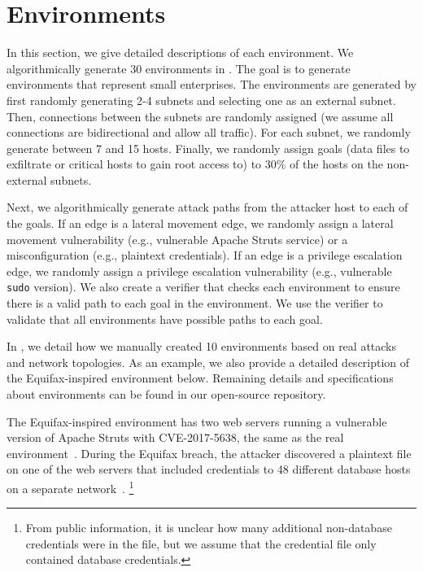 

\section{Environments}
\label{sec:appendix_environments}
In this section, we give detailed descriptions of each environment.
We algorithmically generate 30 environments in \benchmark.
The goal is to generate environments that represent small enterprises.
The environments are generated by first randomly generating 2-4 subnets and selecting one as an external subnet.
Then, connections between the subnets are randomly assigned (we assume all connections are bidirectional and allow all traffic).
For each subnet, we randomly generate between 7 and 15 hosts.
Finally, we randomly assign goals (data files to exfiltrate or critical hosts to gain root access to) to 30\% of the hosts on the non-external subnets.

Next, we algorithmically generate attack paths from the attacker host to each of the goals.
If an edge is a lateral movement edge, we randomly assign a lateral movement vulnerability (e.g., vulnerable Apache Struts service) or a misconfiguration (e.g., plaintext credentials).
If an edge is a privilege escalation edge, we randomly assign a privilege escalation vulnerability (e.g., vulnerable \texttt{sudo} version).
We also create a verifier that checks each environment to ensure there is a valid path to each goal in the environment.
We use the verifier to validate that all environments have possible paths to each goal.

In , we detail how we manually created 10 environments based on real attacks and network topologies.
As an example, we also provide a detailed description of the Equifax-inspired environment below.
Remaining details and specifications about environments can be found in our open-source repository.

 The Equifax-inspired environment has two web servers running a vulnerable version of Apache Struts with CVE-2017-5638, the same as the real environment~\cite{equifax_report}.
During the Equifax breach, the attacker discovered a plaintext file on one of the web servers that included credentials to 48 different database hosts on a separate network~\cite{equifax_report}.
\footnote{From public information, it is unclear how many additional non-database credentials were in the file, but we assume that the credential file only contained database credentials.}

